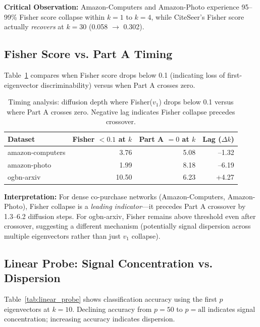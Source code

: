 \documentclass[11pt]{article}
\begin{document}
\textbf{Critical Observation:} Amazon-Computers and Amazon-Photo experience 95--99\% Fisher score collapse within $k{=}1$ to $k{=}4$, while CiteSeer's Fisher score actually \emph{recovers} at $k{=}30$ (0.058 $\to$ 0.302).

\subsection{Fisher Score vs. Part A Timing}

Table~\ref{tab:fisher_timing} compares when Fisher score drops below 0.1 (indicating loss of first-eigenvector discriminability) versus when Part A crosses zero.

\begin{table}[h]
\centering
\caption{Timing analysis: diffusion depth where Fisher($v_1$) drops below 0.1 versus where Part A crosses zero. Negative lag indicates Fisher collapse precedes crossover.}
\label{tab:fisher_timing}
\begin{tabular}{lrrr}
\toprule
\textbf{Dataset} & \textbf{Fisher $< 0.1$ at $k$} & \textbf{Part A $= 0$ at $k$} & \textbf{Lag ($\Delta k$)} \\
\midrule
amazon-computers & 3.76 & 5.08 & --1.32 \\
amazon-photo     & 1.99 & 8.18 & --6.19 \\
ogbn-arxiv       & 10.50 & 6.23 & +4.27 \\
\bottomrule
\end{tabular}
\end{table}

\textbf{Interpretation:} For dense co-purchase networks (Amazon-Computers, Amazon-Photo), Fisher collapse is a \emph{leading indicator}—it precedes Part A crossover by 1.3--6.2 diffusion steps. For ogbn-arxiv, Fisher remains above threshold even after crossover, suggesting a different mechanism (potentially signal dispersion across multiple eigenvectors rather than just $v_1$ collapse).

\subsection{Linear Probe: Signal Concentration vs. Dispersion}

Table~\ref{tab:linear_probe} shows classification accuracy using the first $p$ eigenvectors at $k{=}10$. Declining accuracy from $p{=}50$ to $p{=}\text{all}$ indicates signal concentration; increasing accuracy indicates dispersion.
\end{document}
